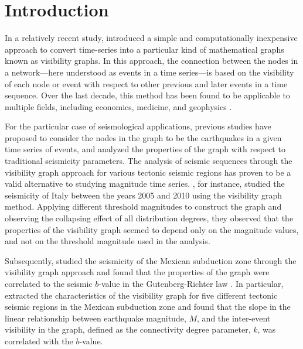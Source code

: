 
\section{Introduction}
\label{sec:introduction}

In a relatively recent study, \citet{Lacasa2008} introduced a simple and computationally inexpensive approach to convert time-series into a particular kind of mathematical graphs known as visibility graphs. In this approach, the connection between the nodes in a network---here understood as events in a time series---is based on the visibility of each node or event with respect to other previous and later events in a time sequence. Over the last decade, this method has been found to be applicable to multiple fields, including economics, medicine, and geophysics \citep[e.g.,][]{Yang_2009_PA, Elsner_2009_GRL, Telesca2012_CSF, Wang2012, Long2013}.

For the particular case of seismological applications, previous studies have proposed to consider the nodes in the graph to be the earthquakes in a given time series of events, and analyzed the properties of the graph with respect to traditional seismicity parameters. The analysis of seismic sequences through the visibility graph approach for various tectonic seismic regions has proven to be a valid alternative to studying magnitude time series. \citet{Telesca2012}, for instance, studied the seismicity of Italy between the years 2005 and 2010 using the visibility graph method. Applying different threshold magnitudes to construct the graph and observing the collapsing effect of all distribution degrees, they observed that the properties of the visibility graph seemed to depend only on the magnitude values, and not on the threshold magnitude used in the analysis. 

Subsequently, \citet{Telesca2013} studied the seismicity of the Mexican subduction zone through the visibility graph approach and found that the properties of the graph were correlated to the seismic $b$-value in the Gutenberg-Richter law \citep{Gutenberg1944}. In particular, \citet{Telesca2013} extracted the characteristics of the visibility graph for five different tectonic seismic regions in the Mexican subduction zone and found that the slope in the linear relationship between earthquake magnitude, $M$, and the inter-event visibility in the graph, defined as the connectivity degree parameter, $k$, was correlated with the $b$-value.

